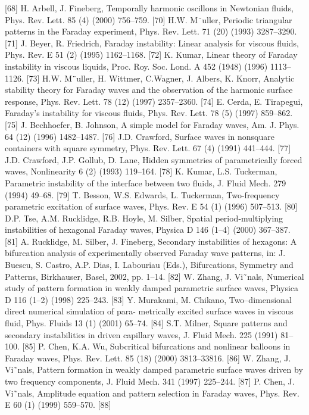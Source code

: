 [68] H. Arbell, J. Fineberg, Temporally harmonic oscillons in Newtonian fluids, Phys. Rev. Lett. 85 (4) (2000) 756–759.
[70] H.W. M¨uller, Periodic triangular patterns in the Faraday experiment, Phys. Rev. Lett. 71 (20) (1993) 3287–3290.
[71] J. Beyer, R. Friedrich, Faraday instability: Linear analysis for viscous fluids, Phys. Rev. E 51 (2) (1995) 1162–1168.
[72] K. Kumar, Linear theory of Faraday instability in viscous liquids, Proc. Roy. Soc. Lond. A 452 (1948) (1996) 1113–1126.
[73] H.W. M¨uller, H. Wittmer, C.Wagner, J. Albers, K. Knorr, Analytic stability theory for Faraday waves and the observation of the harmonic surface response, Phys. Rev. Lett. 78 (12) (1997) 2357–2360.
[74] E. Cerda, E. Tirapegui, Faraday’s instability for viscous fluids, Phys. Rev. Lett. 78 (5) (1997) 859–862.
[75] J. Bechhoefer, B. Johnson, A simple model for Faraday waves, Am. J. Phys. 64 (12) (1996) 1482–1487.
[76] J.D. Crawford, Surface waves in nonsquare containers with square symmetry, Phys. Rev. Lett. 67 (4) (1991) 441–444.
[77] J.D. Crawford, J.P. Gollub, D. Lane, Hidden symmetries of parametrically forced waves, Nonlinearity 6 (2) (1993) 119–164.
[78] K. Kumar, L.S. Tuckerman, Parametric instability of the interface between two fluids, J. Fluid Mech. 279 (1994) 49–68.
[79] T. Besson, W.S. Edwards, L. Tuckerman, Two-frequency parametric excitation of surface waves, Phys. Rev. E 54 (1) (1996) 507–513.
[80] D.P. Tse, A.M. Rucklidge, R.B. Hoyle, M. Silber, Spatial period-multiplying instabilities of hexagonal Faraday waves, Physica D 146 (1–4) (2000) 367–387.
[81] A. Rucklidge, M. Silber, J. Fineberg, Secondary instabilities of hexagons: A bifurcation analysis of experimentally observed Faraday wave patterns, in: J. Buescu, S. Castro, A.P. Dias, I. Labouriau (Eds.), Bifurcations, Symmetry and Patterns, Birkhauser, Basel, 2002, pp. 1–14.
[82] W. Zhang, J. Vi˜nals, Numerical study of pattern formation in weakly damped parametric surface waves, Physica D 116 (1–2) (1998) 225–243.
[83] Y. Murakami, M. Chikano, Two–dimensional direct numerical simulation of para- metrically excited surface waves in viscous fluid, Phys. Fluids 13 (1) (2001) 65–74.
[84] S.T. Milner, Square patterns and secondary instabilities in driven capillary waves, J. Fluid Mech. 225 (1991) 81–100.
[85] P. Chen, K.A. Wu, Subcritical bifurcations and nonlinear balloons in Faraday waves, Phys. Rev. Lett. 85 (18) (2000) 3813–33816.
[86] W. Zhang, J. Vi˜nals, Pattern formation in weakly damped parametric surface waves driven by two frequency components, J. Fluid Mech. 341 (1997) 225–244.
[87] P. Chen, J. Vi˜nals, Amplitude equation and pattern selection in Faraday waves, Phys. Rev. E 60 (1) (1999) 559–570.
[88]



